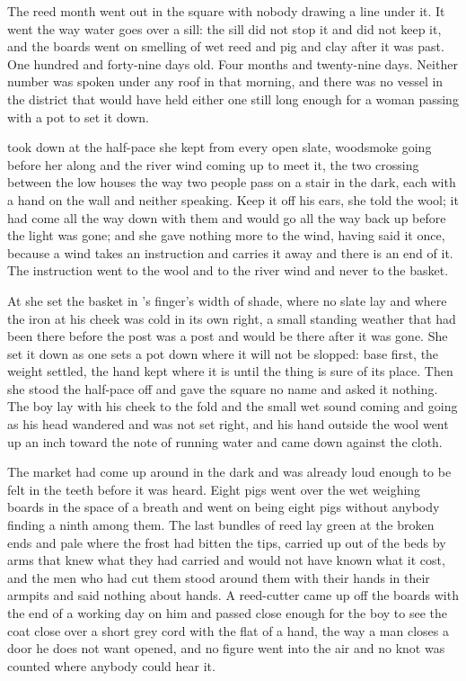 
The reed month went out in the square with nobody drawing a line under it. It went the way water goes over a sill: the sill did not stop it and did not keep it, and the boards went on smelling of wet reed and pig and clay after it was past. One hundred and forty-nine days old. Four months and twenty-nine days. Neither number was spoken under any roof in  that morning, and there was no vessel in the district that would have held either one still long enough for a woman passing with a pot to set it down.

 took  down at the half-pace she kept from every open slate, woodsmoke going before her along  and the river wind coming up to meet it, the two crossing between the low houses the way two people pass on a stair in the dark, each with a hand on the wall and neither speaking. Keep it off his ears, she told the wool; it had come all the way down with them and would go all the way back up before the light was gone; and she gave nothing more to the wind, having said it once, because a wind takes an instruction and carries it away and there is an end of it. The instruction went to the wool and to the river wind and never to the basket.

At  she set the basket in 's finger's width of shade, where no slate lay and where the iron at his cheek was cold in its own right, a small standing weather that had been there before the post was a post and would be there after it was gone. She set it down as one sets a pot down where it will not be slopped: base first, the weight settled, the hand kept where it is until the thing is sure of its place. Then she stood the half-pace off and gave the square no name and asked it nothing. The boy lay with his cheek to the fold and the small wet sound coming and going as his head wandered and was not set right, and his hand outside the wool went up an inch toward the note of running water and came down against the cloth.

The market had come up around  in the dark and was already loud enough to be felt in the teeth before it was heard. Eight pigs went over the wet weighing boards in the space of a breath and went on being eight pigs without anybody finding a ninth among them. The last bundles of reed lay green at the broken ends and pale where the frost had bitten the tips, carried up out of the beds by arms that knew what they had carried and would not have known what it cost, and the men who had cut them stood around them with their hands in their armpits and said nothing about hands. A reed-cutter came up off the boards with the end of a working day on him and passed close enough for the boy to see the coat close over a short grey cord with the flat of a hand, the way a man closes a door he does not want opened, and no figure went into the air and no knot was counted where anybody could hear it.


